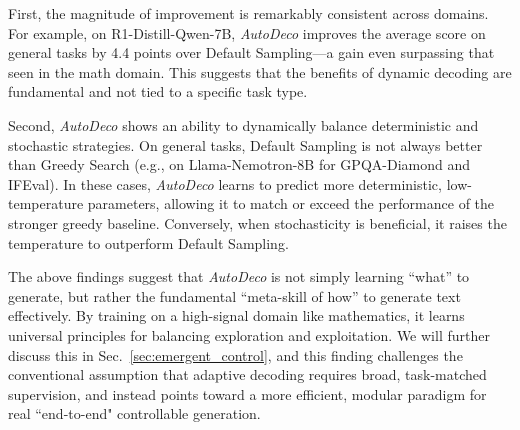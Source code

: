 First, the magnitude of improvement is remarkably consistent across domains. For example, on R1-Distill-Qwen-7B, \textit{AutoDeco} improves the average score on general tasks by 4.4 points over Default Sampling—a gain even surpassing that seen in the math domain. This suggests that the benefits of dynamic decoding are fundamental and not tied to a specific task type.

Second, \textit{AutoDeco} shows an ability to dynamically balance deterministic and stochastic strategies. On general tasks, Default Sampling is not always better than Greedy Search (e.g., on Llama-Nemotron-8B for GPQA-Diamond and IFEval). In these cases, \textit{AutoDeco} learns to predict more deterministic, low-temperature parameters, allowing it to match or exceed the performance of the stronger greedy baseline. Conversely, when stochasticity is beneficial, it raises the temperature to outperform Default Sampling.

The above findings suggest that \textit{AutoDeco} is not simply learning ``what'' to generate, but rather the fundamental ``meta-skill of how'' to generate text effectively. By training on a high-signal domain like mathematics, it learns universal principles for balancing exploration and exploitation. We will further discuss this in Sec.~\ref{sec:emergent_control}, and this finding challenges the conventional assumption that adaptive decoding requires broad, task-matched supervision, and instead points toward a more efficient, modular paradigm for real ``end-to-end" controllable generation.

